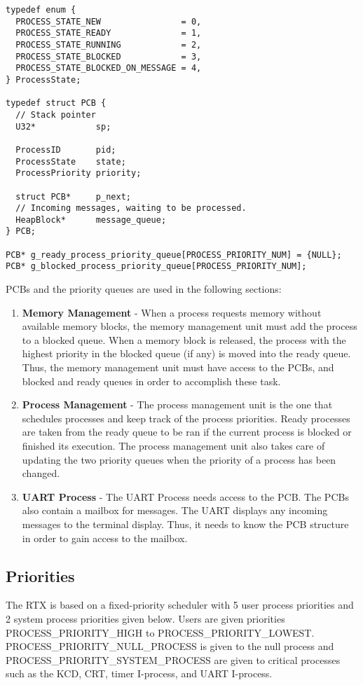 \documentclass[12pt]{report}
\begin{document}
\begin{lstlisting}
typedef enum {
  PROCESS_STATE_NEW                = 0,
  PROCESS_STATE_READY              = 1,
  PROCESS_STATE_RUNNING            = 2,
  PROCESS_STATE_BLOCKED            = 3,
  PROCESS_STATE_BLOCKED_ON_MESSAGE = 4,
} ProcessState;

typedef struct PCB {
  // Stack pointer
  U32*            sp;

  ProcessID       pid;
  ProcessState    state;
  ProcessPriority priority;

  struct PCB*     p_next;
  // Incoming messages, waiting to be processed.
  HeapBlock*      message_queue;
} PCB;

PCB* g_ready_process_priority_queue[PROCESS_PRIORITY_NUM] = {NULL};
PCB* g_blocked_process_priority_queue[PROCESS_PRIORITY_NUM];
\end{lstlisting}

PCBs and the priority queues are used in the following sections:
\begin{enumerate}
    \item {\bf Memory Management} - When a process requests memory without available memory blocks, the memory management unit must add the process to a blocked queue. When a memory block is released, the process with the highest priority in the blocked queue (if any) is moved into the ready queue. Thus, the memory management unit must have access to the PCBs, and blocked and ready queues in order to accomplish these task.
    \item {\bf Process Management} - The process management unit is the one that schedules processes and keep track of the process priorities. Ready processes are taken from the ready queue to be ran if the current process is blocked or finished its execution. The process management unit also takes care of updating the two priority queues when the priority of a process has been changed.
    \item {\bf UART Process} - The UART Process needs access to the PCB. The PCBs also contain a mailbox for messages. The UART displays any incoming messages to the terminal display. Thus, it needs to know the PCB structure in order to gain access to the mailbox.
\end{enumerate}

\subsection{Priorities}
The RTX is based on a fixed-priority scheduler with 5 user process priorities and 2 system process priorities given below. Users are given priorities PROCESS\_PRIORITY\_HIGH to PROCESS\_PRIORITY\_LOWEST. PROCESS\_PRIORITY\_NULL\_PROCESS is given to the null process and PROCESS\_PRIORITY\_SYSTEM\_PROCESS are given to critical processes such as the KCD, CRT, timer I-process, and UART I-process.
\end{document}
